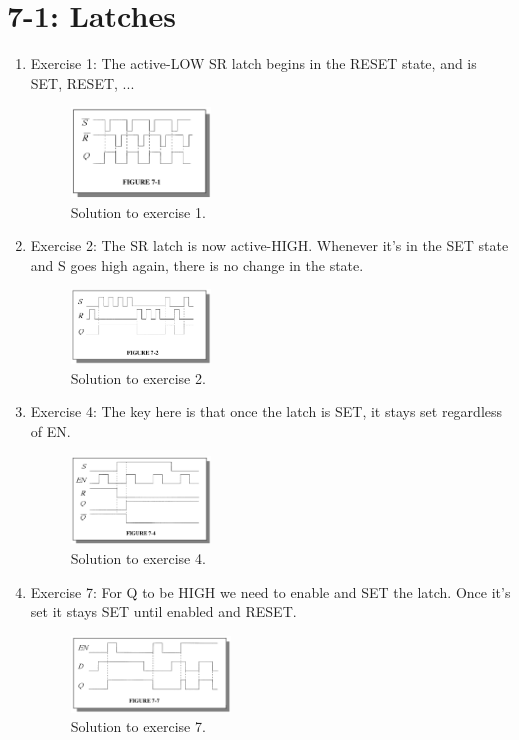 \documentclass[10pt]{article}
\begin{document}
\maketitle

\section{7-1: Latches}

\begin{enumerate}
\item Exercise 1: The active-LOW SR latch begins in the RESET state, and is SET, RESET, ...
\begin{figure}[ht]
\centering
\includegraphics[width=0.35\textwidth]{exercise1_ch7.png}
\caption{\label{fig:ex1} Solution to exercise 1.}
\end{figure}
\item Exercise 2: The SR latch is now active-HIGH.  Whenever it's in the SET state and S goes high again, there is no change in the state.
\begin{figure}[ht]
\centering
\includegraphics[width=0.35\textwidth]{exercise2_ch7.png}
\caption{\label{fig:ex2} Solution to exercise 2.}
\end{figure}
\item Exercise 4: The key here is that once the latch is SET, it stays set regardless of EN.
\begin{figure}[hb]
\centering
\includegraphics[width=0.35\textwidth]{exercise4_ch7.png}
\caption{\label{fig:ex4} Solution to exercise 4.}
\end{figure}
\clearpage
\item Exercise 7: For Q to be HIGH we need to enable and SET the latch.  Once it's set it stays SET until enabled and RESET.
\begin{figure}[hb]
\centering
\includegraphics[width=0.4\textwidth]{exercise7_ch7.png}
\caption{\label{fig:ex7} Solution to exercise 7.}
\end{figure}
\end{enumerate}
\end{document}
